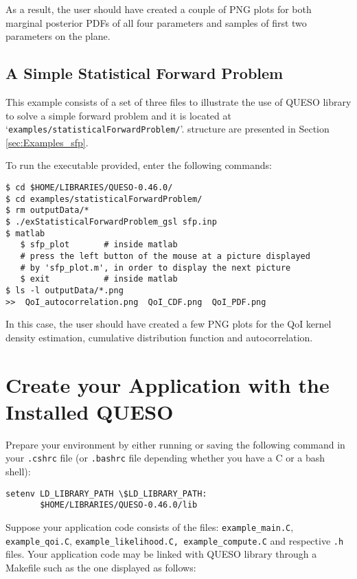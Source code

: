 As a result, the user should have created a couple of PNG plots for both
marginal posterior PDFs of all four parameters and samples of first two
parameters on the plane.

\subsection{A Simple Statistical Forward Problem}

This example consists of a set of three files to illustrate the use of QUESO
library to solve a simple forward problem and it is located at
`\texttt{examples/statisticalForwardProblem/}'. %
structure are presented in Section \ref{sec:Examples_sfp}.

To run the executable provided, enter the following commands:
\begin{lstlisting}[label={},caption={}]
$ cd $HOME/LIBRARIES/QUESO-0.46.0/
$ cd examples/statisticalForwardProblem/
$ rm outputData/*
$ ./exStatisticalForwardProblem_gsl sfp.inp  
$ matlab
   $ sfp_plot       # inside matlab
   # press the left button of the mouse at a picture displayed 
   # by 'sfp_plot.m', in order to display the next picture
   $ exit           # inside matlab
$ ls -l outputData/*.png
>>  QoI_autocorrelation.png  QoI_CDF.png  QoI_PDF.png  
\end{lstlisting}


In this case, the user should have created a few PNG plots for the QoI kernel
density estimation, cumulative distribution function and autocorrelation.



\section{Create your Application with the Installed QUESO} \label{sc-use-queso}

Prepare your environment by either running or saving the following command in
your \verb+.cshrc+ file (or \verb+.bashrc+ file depending whether you have a C
or a bash shell):

\begin{lstlisting}[label={},caption={}]
setenv LD_LIBRARY_PATH \$LD_LIBRARY_PATH:
       $HOME/LIBRARIES/QUESO-0.46.0/lib
\end{lstlisting}


Suppose your application code consists of the files:  \verb+example_main.C+,
\verb+example_qoi.C+,  \verb+example_likelihood.C, example_compute.C+ and
respective \verb+.h+ files. Your application code may be linked with QUESO
library through a Makefile such as the one displayed as follows:


